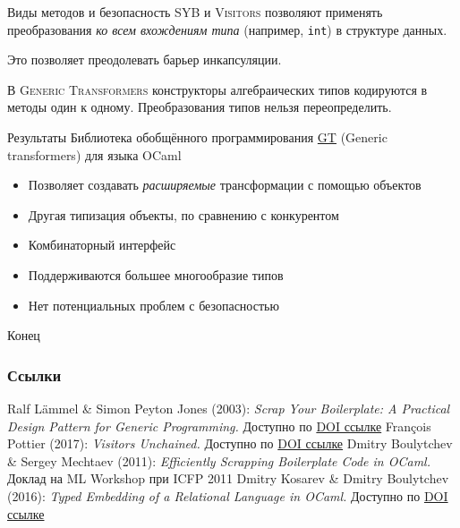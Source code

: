 \documentclass[
  russian,
  aspectratio=43,
  xcolor={svgnames},
  hyperref={colorlinks,citecolor=DeepPink4,linkcolor=DarkRed,urlcolor=DarkBlue}]{beamer}
\begin{document}
\begin{frame}[fragile]{Виды методов и безопасность}
\textsc{SYB} и \textsc{Visitors} позволяют применять преобразования \emph{ко всем вхождениям типа} (например, \texttt{int}) в структуре данных. \vspace{1cm}

Это позволяет преодолевать барьер инкапсуляции.\vspace{1cm}

В \textsc{Generic Transformers} конструкторы алгебраических типов кодируются в методы один к одному. Преобразования типов нельзя переопределить.
\end{frame}

\begin{frame}[fragile]{Результаты}
Библиотека обобщённого программирования \href{https://github.com/Kakadu/GT/tree/ppx/}{GT} (Generic transformers) для языка OCaml
\begin{itemize}
 \item Позволяет создавать \emph{расширяемые} трансформации с помощью объектов
 \item Другая типизация объекты, по сравнению с конкурентом
 \item Комбинаторный интерфейс
 \item Поддерживаются большее многообразие типов
 \item Нет потенциальных проблем с безопасностью
\end{itemize}\pause
\begin{center}
  \Huge Конец
 \end{center}
\end{frame}

\begin{frame}[allowframebreaks]
  \frametitle<presentation>{Ссылки}
  \begin{thebibliography}{10}
  \beamertemplatebookbibitems
    Ralf Lämmel \& Simon Peyton Jones (2003): \emph{Scrap Your Boilerplate: A Practical Design Pattern for Generic Programming. }
    \newblock Доступно по \href{http://dx.doi.org/10.1145/640136.604179}{DOI ссылке}
   \bibitem{}
    François Pottier (2017): \emph{Visitors Unchained.}
    \newblock Доступно по \href{http://doi.acm.org/10.1145/3110272}{DOI ссылке}
  \bibitem{}
    Dmitry Boulytchev \& Sergey Mechtaev (2011): \emph{Efficiently Scrapping Boilerplate Code in OCaml.}
    \newblock Доклад на ML Workshop при ICFP 2011
   \bibitem{}
    Dmitry Kosarev \& Dmitry Boulytchev (2016): \emph{Typed Embedding of a Relational Language in OCaml.}
    \newblock Доступно по \href{http://dx.doi.org/10.4204/EPTCS.285.1}{DOI ссылке}
 \end{thebibliography}
\end{frame}
\end{document}
